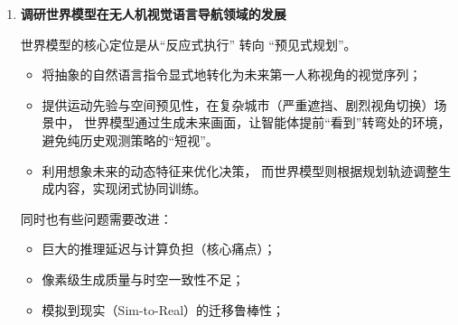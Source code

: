 \documentclass[10pt,letterpaper,oneside]{article}
\begin{document}
\begin{enumerate}

  \item \Large\textbf{调研世界模型在无人机视觉语言导航领域的发展}
  
  \normalsize{
    世界模型的核心定位是从“反应式执行” 转向 “预见式规划”。
    \begin{itemize}
      \item 将抽象的自然语言指令显式地转化为未来第一人称视角的视觉序列；
      \item 提供运动先验与空间预见性，在复杂城市（严重遮挡、剧烈视角切换）场景中，
      世界模型通过生成未来画面，让智能体提前“看到”转弯处的环境，避免纯历史观测策略的“短视”。
      \item 利用想象未来的动态特征来优化决策，
      而世界模型则根据规划轨迹调整生成内容，实现闭式协同训练。
    \end{itemize} 

    同时也有些问题需要改进：
    \begin{itemize}
      \item 巨大的推理延迟与计算负担（核心痛点）；
      \item 像素级生成质量与时空一致性不足；
      \item 模拟到现实（Sim-to-Real）的迁移鲁棒性；
    \end{itemize} 
  }


 


\end{enumerate}
\end{document}
